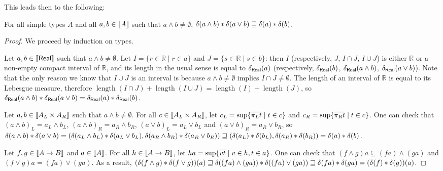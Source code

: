 This leads then to the following:
\begin{proposition}\label{prop:submodular} For all simple types $A$ and all $a,b \in \llbracket A \rrbracket$ such that $a \wedge b \neq \emptyset$, $\delta(a \wedge b) \mathbin{\ast} \delta(a \vee b) \sqsupseteq \delta(a) \mathbin{\ast} \delta(b)$.
\end{proposition}
\begin{proof}
We proceed by induction on types.

Let $a,b \in \llbracket \mathsf{Real} \rrbracket$ such that $a\wedge b \neq \emptyset$. Let $I = \{r \in \mathbb{R} \mid r \in a\}$ and $J = \{s \in \mathbb{R} \mid s \in b\}$: then $I$ (respectively, $J$, $I \cap J$, $I \cup J$) is either $\mathbb{R}$ or a non-empty compact interval of $\mathbb{R}$, and its length in the usual sense is equal to $\delta_\mathsf{Real}(a)$ (respectively, $\delta_\mathsf{Real}(b)$, $\delta_\mathsf{Real}(a \wedge b)$, $\delta_\mathsf{Real}(a \vee b)$). Note that the only reason we know that $I \cup J$ is an interval is because $a\wedge b \neq \emptyset$ implies $I \cap J \neq \emptyset$. The length of an interval of $\mathbb{R}$ is equal to its Lebesgue measure, therefore $\operatorname{length}(I \cap J) + \operatorname{length}(I \cup J) = \operatorname{length}(I) + \operatorname{length}(J)$, so $\delta_\mathsf{Real}(a \wedge b) \mathbin{\ast} \delta_\mathsf{Real}(a \vee b) = \delta_\mathsf{Real}(a) \mathbin{\ast} \delta_\mathsf{Real}(b)$.

Let $a,b \in \llbracket A_L \times A_R \rrbracket$ such that $a\wedge b \neq \emptyset$. For all $c \in \llbracket A_L \times A_R \rrbracket$, let $c_L = \sup\{\overline{\pi_L t} \mid t \in c\}$ and $c_R = \sup\{\overline{\pi_R t} \mid t \in c\}$.
One can check that $(a \wedge b)_L = a_L \wedge b_L$, $(a \wedge b)_R = a_R \wedge b_R$, $(a \vee b)_L = a_L \vee b_L$ and $(a \vee b)_R = a_R \vee b_R$, so $\delta(a \wedge b) \mathbin{\ast} \delta(a \vee b) = (\delta(a_L \wedge b_L) \mathbin{\ast} \delta(a_L \vee b_L),  \delta(a_R \wedge b_R) \mathbin{\ast} \delta(a_R \vee b_R)) \sqsupseteq (\delta(a_L) \mathbin{\ast} \delta(b_L), \delta(a_R) \mathbin{\ast} \delta(b_R)) = \delta(a) \mathbin{\ast} \delta(b)$.

Let $f,g \in \llbracket A \to B \rrbracket$ and $a \in \llbracket A \rrbracket$. For all $h \in \llbracket A \to B \rrbracket$, let $ha = \sup\{\overline{vt} \mid v \in h, t \in a\}$. One can check that $(f \wedge g)a \subseteq (f a) \wedge (g a)$ and $(f \vee g)a = (f a) \vee (g a)$. As a result, $(\delta(f \wedge g)\mathbin{\ast} \delta(f \vee g))(a) \sqsupseteq \delta((fa) \wedge (ga)) \mathbin{\ast} \delta((fa) \vee (ga)) \sqsupseteq \delta(fa) \mathbin{\ast} \delta(ga) = (\delta(f)\mathbin{\ast}\delta(g))(a)$.
\end{proof}

